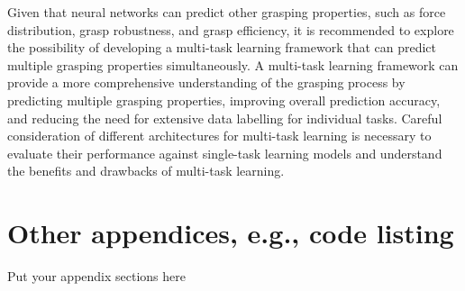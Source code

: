\documentclass[11pt, a4paper]{report}
\begin{document}
Given that neural networks can predict other grasping properties, such as force distribution, grasp robustness, and grasp efficiency, it is recommended to explore the possibility of developing a multi-task learning framework that can predict multiple grasping properties simultaneously. A multi-task learning framework can provide a more comprehensive understanding of the grasping process by predicting multiple grasping properties, improving overall prediction accuracy, and reducing the need for extensive data labelling for individual tasks. Careful consideration of different architectures for multi-task learning is necessary to evaluate their performance against single-task learning models and understand the benefits and drawbacks of multi-task learning.

 

\appendix
\printbibliography

\chapter{Other appendices, e.g., code listing}
Put your appendix sections here
\end{document}
